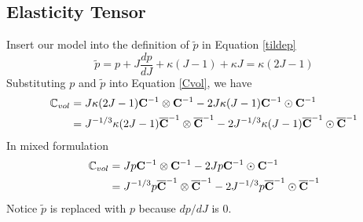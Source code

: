 %
\subsection{Elasticity Tensor}
Insert our model into the definition of $\tilde{p}$ in Equation \ref{tildep}
\begin{equation}
\tilde{p} = p + J\frac{dp}{dJ} + \kappa(J-1) + \kappa{J} = \kappa{(2J - 1)}
\end{equation}
Substituting $p$ and $\tilde{p}$ into Equation \ref{Cvol}, we have
\begin{equation}
\begin{split}
\mathbb{C}_{vol} &= J\kappa{(2J-1)} \bold{C}^{-1} \otimes \bold{C}^{-1} - 2J\kappa{(J-1)} \bold{C}^{-1} \odot \bold{C}^{-1}  \\
&= J^{-1/3}\kappa{(2J-1)} \overline{\bold{C}}^{-1} \otimes \overline{\bold{C}}^{-1} - 2J^{-1/3}\kappa{(J-1)} \overline{\bold{C}}^{-1} \odot \overline{\bold{C}}^{-1}
\end{split}
\end{equation}
In mixed formulation
\begin{equation} \label{mCvol}
\begin{split}
\mathbb{C}_{vol} &= Jp\bold{C}^{-1}\otimes\bold{C}^{-1} - 2Jp\bold{C}^{-1}\odot\bold{C}^{-1} \\
&= J^{-1/3}p\overline{\bold{C}}^{-1}\otimes\overline{\bold{C}}^{-1} - 2J^{-1/3}p\overline{\bold{C}}^{-1}\odot\overline{\bold{C}}^{-1}
\end{split}
\end{equation}
Notice $\tilde{p}$ is replaced with $p$ because ${dp}/{dJ}$ is $0$.

